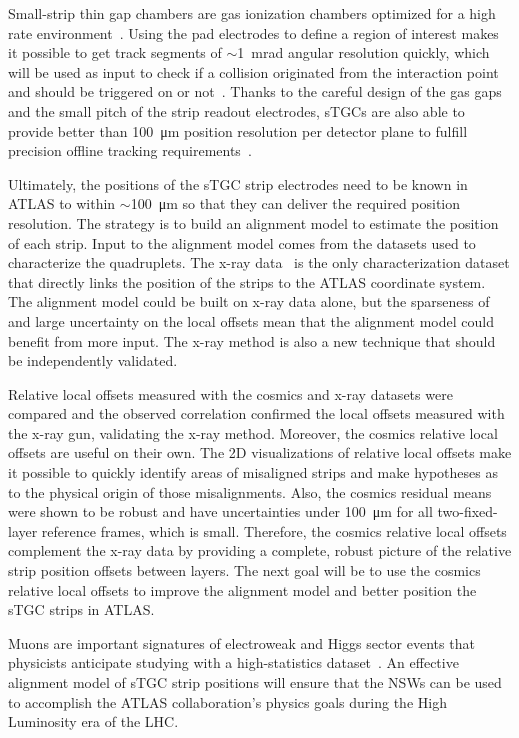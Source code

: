 Small-strip thin gap chambers are gas ionization chambers optimized for a high rate environment~\cite{nsw_tdr}. Using the pad electrodes to define a region of interest makes it possible to get track segments of $\sim$\SI{1}{mrad} angular resolution quickly, which will be used as input to check if a collision originated from the interaction point and should be triggered on or not~\cite{nsw_tdr, perez-codina_small-strip_2016}. Thanks to the careful design of the gas gaps and the small pitch of the strip readout electrodes, sTGCs are also able to provide better than \SI{100}{\micro\meter} position resolution per detector plane to fulfill precision offline tracking requirements~\cite{abusleme_performance_2016}. 

Ultimately, the positions of the sTGC strip electrodes need to be known in ATLAS to within $\sim$\SI{100}{\micro\meter} so that they can deliver the required position resolution. The strategy is to build an alignment model to estimate the position of each strip. Input to the alignment model comes from the datasets used to characterize the quadruplets. The x-ray data~\cite{lefebvre_precision_2020} is the only characterization dataset that directly links the position of the strips to the ATLAS coordinate system. The alignment model could be built on x-ray data alone, but the sparseness of and large uncertainty on the local offsets mean that the alignment model could benefit from more input. The x-ray method is also a new technique that should be independently validated.

Relative local offsets measured with the cosmics and x-ray datasets were compared and the observed correlation confirmed the local offsets measured with the x-ray gun, validating the x-ray method. Moreover, the cosmics relative local offsets are useful on their own. The 2D visualizations of relative local offsets make it possible to quickly identify areas of misaligned strips and make hypotheses as to the physical origin of those misalignments. Also, the cosmics residual means were shown to be robust and have uncertainties under \SI{100}{\micro\meter} for all two-fixed-layer reference frames, which is small. Therefore, the cosmics relative local offsets complement the x-ray data by providing a complete, robust picture of the relative strip position offsets between layers. The next goal will be to use the cosmics relative local offsets to improve the alignment model and better position the sTGC strips in ATLAS.

Muons are important signatures of electroweak and Higgs sector events that physicists anticipate studying with a high-statistics dataset~\cite{dainese_physics_2018, nsw_tdr}. An effective alignment model of sTGC strip positions will ensure that the NSWs can be used to accomplish the ATLAS collaboration's physics goals during the High Luminosity era of the LHC.

